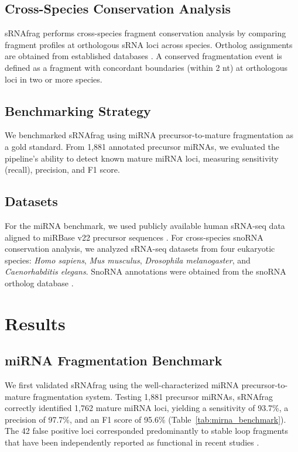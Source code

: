 \documentclass[11pt]{article}
\begin{document}
\subsection{Cross-Species Conservation Analysis}

sRNAfrag performs cross-species fragment conservation analysis by comparing fragment profiles at orthologous sRNA loci across species. Ortholog assignments are obtained from established databases \citep{fromm2015}. A conserved fragmentation event is defined as a fragment with concordant boundaries (within 2 nt) at orthologous loci in two or more species.

\subsection{Benchmarking Strategy}

We benchmarked sRNAfrag using miRNA precursor-to-mature fragmentation as a gold standard. From 1,881 annotated precursor miRNAs, we evaluated the pipeline's ability to detect known mature miRNA loci, measuring sensitivity (recall), precision, and F1 score.

\subsection{Datasets}

For the miRNA benchmark, we used publicly available human sRNA-seq data aligned to miRBase v22 precursor sequences \citep{kozomara2019}. For cross-species snoRNA conservation analysis, we analyzed sRNA-seq datasets from four eukaryotic species: \textit{Homo sapiens}, \textit{Mus musculus}, \textit{Drosophila melanogaster}, and \textit{Caenorhabditis elegans}. SnoRNA annotations were obtained from the snoRNA ortholog database \citep{jorjani2016}.

\section{Results}

\subsection{miRNA Fragmentation Benchmark}

We first validated sRNAfrag using the well-characterized miRNA precursor-to-mature fragmentation system. Testing 1,881 precursor miRNAs, sRNAfrag correctly identified 1,762 mature miRNA loci, yielding a sensitivity of 93.7\%, a precision of 97.7\%, and an F1 score of 95.6\% (Table~\ref{tab:mirna_benchmark}). The 42 false positive loci corresponded predominantly to stable loop fragments that have been independently reported as functional in recent studies \citep{okamura2013}.
\end{document}
